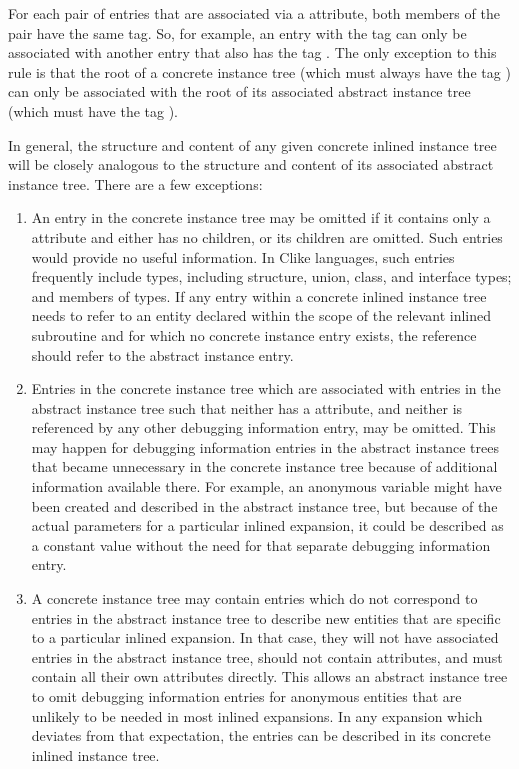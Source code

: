 For each pair of entries that are associated via a
\DWATabstractorigin{} attribute, both members of the pair
have the same tag. So, for example, an entry with the tag
\DWTAGvariable{} can only be associated with another entry
that also has the tag \DWTAGvariable. The only exception
to this rule is that the root of a concrete instance tree
(which must always have the tag \DWTAGinlinedsubroutine)
can only be associated with the root of its associated abstract
instance tree (which must have the tag \DWTAGsubprogram).

In general, the structure and content of any given concrete
inlined instance tree will be closely analogous to the
structure and content of its associated abstract instance
tree. There are a few exceptions:

\begin{enumerate}[1. ]
\item An entry in the concrete instance tree may be omitted if
it contains only a 
\DWATabstractorigin{} attribute and either
has no children, or its children are omitted. Such entries
would provide no useful information. In C\dash like languages,
such entries frequently include types, including structure,
union, class, and interface types; and members of types. If any
entry within a concrete inlined instance tree needs to refer
to an entity declared within the scope of the relevant inlined
subroutine and for which no concrete instance entry exists,
the reference should refer to the abstract instance entry.

\item Entries in the concrete instance tree which are associated
with entries in the abstract instance tree such that neither
has a \DWATname{} attribute,
and neither is referenced by
any other debugging information entry, may be omitted. This
may happen for debugging information entries in the abstract
instance trees that became unnecessary in the concrete instance
tree because of additional information available there. For
example, an anonymous variable might have been created and
described in the abstract instance tree, but because of
the actual parameters for a particular inlined expansion,
it could be described as a constant value without the need
for that separate debugging information entry.

\item A concrete instance tree may contain entries which do
not correspond to entries in the abstract instance tree
to describe new entities that are specific to a particular
inlined expansion. In that case, they will not have associated
entries in the abstract instance tree, should not contain
\DWATabstractorigin{} attributes, and must contain all their
own attributes directly. This allows an abstract instance tree
to omit debugging information entries for anonymous entities
that are unlikely to be needed in most inlined expansions. In
any expansion which deviates from that expectation, the
entries can be described in its concrete inlined instance tree.

\end{enumerate}

